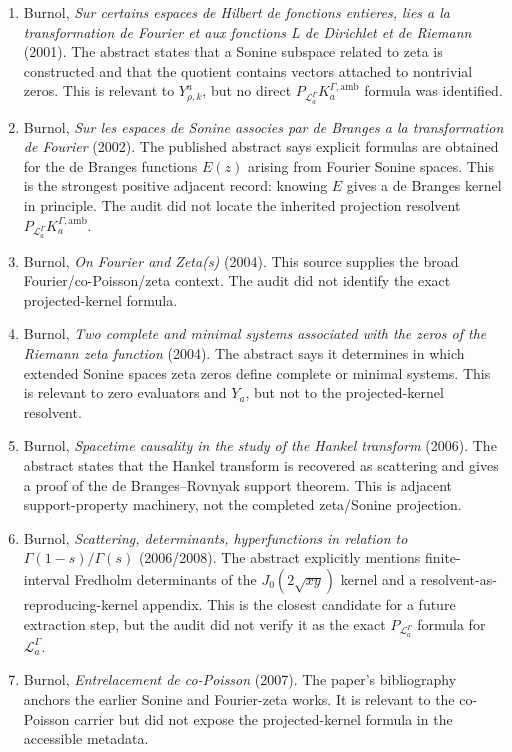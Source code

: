 \documentclass[11pt]{article}
\newcommand{\LaG}{\mathcal L_a^\Gamma}
\newcommand{\Kamb}{K_a^{\Gamma,\mathrm{amb}}}
\newcommand{\PL}{P_{\mathcal L_a^\Gamma}}
\begin{document}
\begin{enumerate}
\item Burnol, \emph{Sur certains espaces de Hilbert de fonctions entieres, lies a la transformation de Fourier et aux fonctions L de Dirichlet et de Riemann} (2001).  The abstract states that a Sonine subspace related to zeta is constructed and that the quotient contains vectors attached to nontrivial zeros.  This is relevant to \(Y^a_{\rho,k}\), but no direct \(\PL\Kamb\) formula was identified.

\item Burnol, \emph{Sur les espaces de Sonine associes par de Branges a la transformation de Fourier} (2002).  The published abstract says explicit formulas are obtained for the de Branges functions \(E(z)\) arising from Fourier Sonine spaces.  This is the strongest positive adjacent record: knowing \(E\) gives a de Branges kernel in principle.  The audit did not locate the inherited projection resolvent \(\PL\Kamb\).

\item Burnol, \emph{On Fourier and Zeta(s)} (2004).  This source supplies the broad Fourier/co-Poisson/zeta context.  The audit did not identify the exact projected-kernel formula.

\item Burnol, \emph{Two complete and minimal systems associated with the zeros of the Riemann zeta function} (2004).  The abstract says it determines in which extended Sonine spaces zeta zeros define complete or minimal systems.  This is relevant to zero evaluators and \(Y_a\), but not to the projected-kernel resolvent.

\item Burnol, \emph{Spacetime causality in the study of the Hankel transform} (2006).  The abstract states that the Hankel transform is recovered as scattering and gives a proof of the de Branges--Rovnyak support theorem.  This is adjacent support-property machinery, not the completed zeta/Sonine projection.

\item Burnol, \emph{Scattering, determinants, hyperfunctions in relation to \(\Gamma(1-s)/\Gamma(s)\)} (2006/2008).  The abstract explicitly mentions finite-interval Fredholm determinants of the \(J_0(2\sqrt{xy})\) kernel and a resolvent-as-reproducing-kernel appendix.  This is the closest candidate for a future extraction step, but the audit did not verify it as the exact \(\PL\) formula for \(\LaG\).

\item Burnol, \emph{Entrelacement de co-Poisson} (2007).  The paper's bibliography anchors the earlier Sonine and Fourier-zeta works.  It is relevant to the co-Poisson carrier but did not expose the projected-kernel formula in the accessible metadata.
\end{enumerate}
\end{document}
